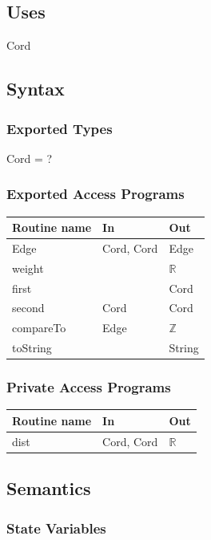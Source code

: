 \documentclass[12pt]{article}
\begin{document}
\subsection* {Uses}

Cord

\subsection* {Syntax}

\subsubsection* {Exported Types}

Cord = ?

\subsubsection* {Exported Access Programs}

\begin{tabular}{| l | l | l |}
\hline
\textbf{Routine name} & \textbf{In} & \textbf{Out}\\
\hline
Edge & Cord, Cord & Edge\\
\hline
weight & ~ & $\mathbb{R}$\\
\hline
first & ~ & Cord \\
\hline
second & Cord & Cord\\
\hline
compareTo & Edge & $\mathbb{Z}$\\
\hline
toString & ~ & String\\
\hline
\end{tabular}

\subsubsection* {Private Access Programs}

\begin{tabular}{| l | l | l |}
\hline
\textbf{Routine name} & \textbf{In} & \textbf{Out}\\
\hline
dist & Cord, Cord & $\mathbb{R}$ \\
\hline
\end{tabular}

\subsection* {Semantics}

\subsubsection* {State Variables}
\end{document}
